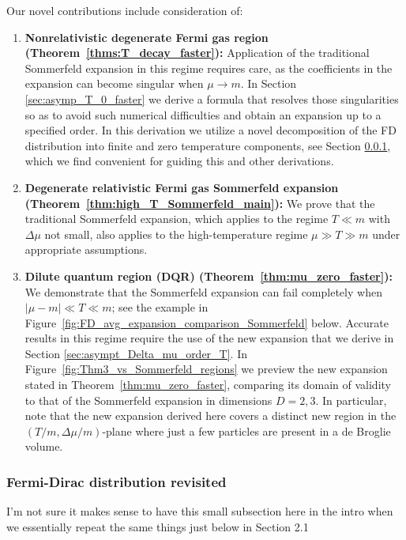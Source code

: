 \documentclass[sn-mathphys,Numbered]{sn-jnl}
\newcommand{\rf}[1]{Figure~{\ref{#1}}}
\newcommand*{\xblue}{\color{blue}}
\newcommand{\rTh}[1]{Theorem~{\ref{#1}}}
\begin{document}
Our novel contributions include consideration of:
\begin{enumerate}
\item {\bf Nonrelativistic degenerate Fermi gas region (\rTh{thms:T_decay_faster}):} Application of the traditional Sommerfeld expansion in this regime requires care, as the coefficients in the expansion can become singular when $\mu\to m$. In Section \ref{sec:asymp_T_0_faster} we derive a formula that resolves those singularities so as to avoid such numerical difficulties and obtain an expansion up to a specified order.  In this derivation we utilize a novel decomposition of the FD distribution into finite and zero temperature components, see Section \ref{FermiDvisit}, which we find convenient for guiding this and other derivations.
\item {\bf Degenerate relativistic Fermi gas Sommerfeld expansion (\rTh{thm:high_T_Sommerfeld_main}):} We prove that the traditional Sommerfeld expansion, which applies to the regime $T\ll m$ with $\Delta\mu$ not small, also applies to the high-temperature regime $\mu\gg T\gg m$ under appropriate assumptions.
\item {\bf Dilute quantum region (DQR) (\rTh{thm:mu_zero_faster}):} We demonstrate that the Sommerfeld expansion can fail completely when $|\mu-m|\ll T\ll m$; see the example in \rf{fig:FD_avg_expansion_comparison_Sommerfeld} below. Accurate results in this regime require the use of the new expansion that we derive in Section \ref{sec:asympt_Delta_mu_order_T}. In \rf{fig:Thm3_vs_Sommerfeld_regions} we preview the new expansion stated in \rTh{thm:mu_zero_faster}, comparing its domain of validity to that of the Sommerfeld expansion in dimensions $D=2,3$. In particular, note that the new expansion derived here covers a distinct new region in the $(T/m,\Delta\mu/m)$-plane where just a few particles are present in a de Broglie volume.
\end{enumerate}




\subsubsection{Fermi-Dirac distribution revisited}\label{FermiDvisit}

{\xblue I'm not sure it makes sense to have this small subsection here in the intro when we essentially repeat the same things just below in Section 2.1}
\end{document}
